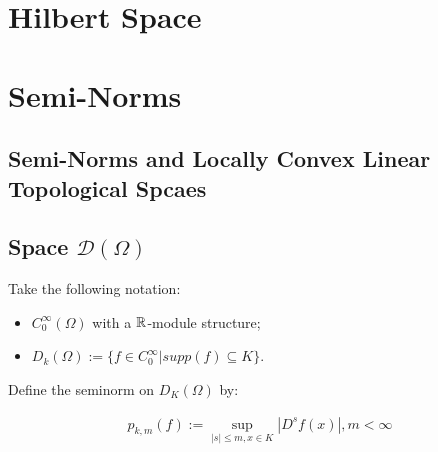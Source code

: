 \documentclass[Total.Tex]{subfiles}
\begin{document}
	\chapter{Hilbert Space}
	\chapter{Semi-Norms}
	
		\section{Semi-Norms and Locally Convex Linear Topological Spcaes}
			
		\section{Space $\mathcal{D}(\Omega)$}
		
		\begin{Def}
			Take the following notation:
			
			\begin{itemize}
				\item $C_0^\infty(\Omega)$ with a $\mathbb{R}$-module structure;
				\item $D_k(\Omega):=\{f\in C_0^\infty|supp(f)\subseteq K\}$.
			\end{itemize}
			
			Define the seminorm on $D_K(\Omega)$ by:
			
			\begin{gather*}
				p_{k,m}(f):=\sup_{|s|\leq m,x\in K} |D^s f(x)|,m<\infty
			\end{gather*}
		\end{Def}
\end{document}
